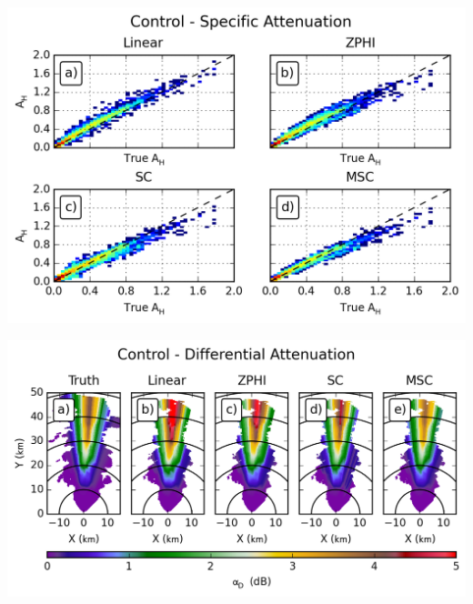 \documentclass[red]{beamer}
\begin{document}
\begin{frame}
    \begin{center}
        \includegraphics[scale=0.7]{figures/spatial/C_Control_Specific_Attenuation_H_scatter}
    \end{center}
\end{frame}

\begin{frame}
    \begin{center}
        \includegraphics[scale=0.7]{figures/spatial/C_Control_Differential_Attenuation}
    \end{center}
\end{frame}
\end{document}
